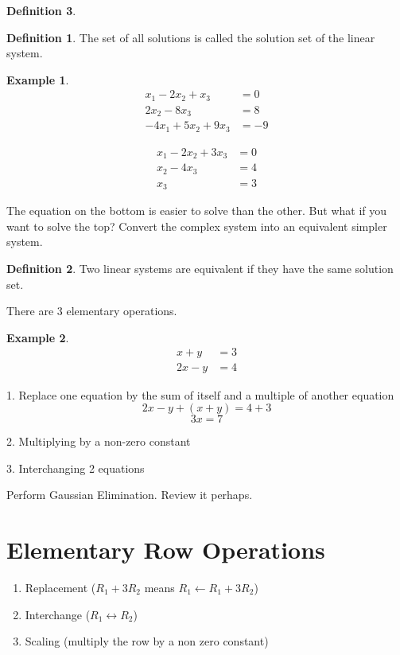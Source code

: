 \documentclass[11pt]{article}
\theoremstyle{definition}
\newtheorem{defn}{Definition}
\newtheorem{eg}{Example}
\begin{document}
\begin{defn}
\begin{defn}
The set of all solutions is called the solution set of the linear system. 
\end{defn}

\begin{eg}
\begin{align*}
x_1 -2x_2 + x_3 &= 0 \\
2x_2 - 8x_3 &= 8 \\
-4x_1 + 5x_2 + 9x_3 &= -9
\end{align*}

\begin{align*}
x_1 - 2x_2 + 3x_3 &= 0 \\
x_2 - 4x_3 &= 4 \\
x_3 &= 3
\end{align*}
\end{eg}
The equation on the bottom is easier to solve than the other. But what if you want to solve the top? Convert the complex system into an equivalent simpler system. 

\begin{defn}
Two linear systems are equivalent if they have the same solution set. 
\end{defn}

There are 3 elementary operations.

\begin{eg}
\begin{align*}
x+y &= 3 \\
2x-y &= 4
\end{align*}

1. Replace one equation by the sum of itself and a multiple of another equation
$$2x - y+(x+y) = 4 + 3 $$
$$3x = 7 $$

2. Multiplying by a non-zero constant 

3. Interchanging 2 equations

Perform Gaussian Elimination. Review it perhaps.

\section{Elementary Row Operations}
\begin{enumerate}
\item Replacement ($R_1 + 3R_2$ means $R_1 \leftarrow R_1 + 3R_2$)
\item Interchange ($R_1 \leftrightarrow R_2$)
\item Scaling (multiply the row by a non zero constant)
\end{enumerate}


\end{eg}
\end{defn}
\end{document}
